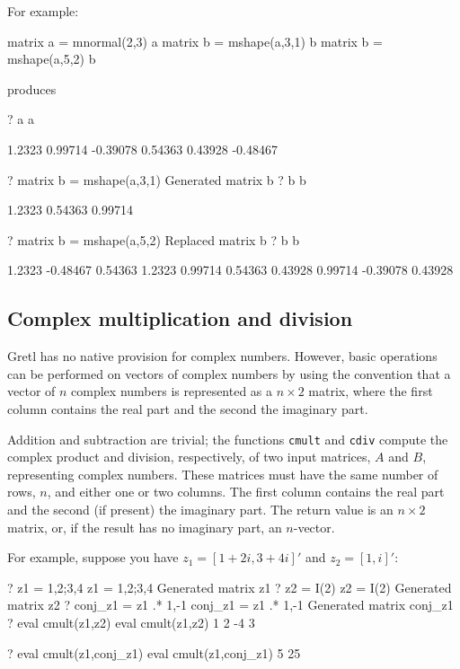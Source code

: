 For example:
\begin{code}
matrix a = mnormal(2,3)
a
matrix b = mshape(a,3,1)
b
matrix b = mshape(a,5,2)
b
\end{code}
produces
\begin{code}
?   a
a

      1.2323      0.99714     -0.39078
     0.54363      0.43928     -0.48467

?   matrix b = mshape(a,3,1)
Generated matrix b
?   b
b

      1.2323
     0.54363
     0.99714

?   matrix b = mshape(a,5,2)
Replaced matrix b
?   b
b

      1.2323     -0.48467
     0.54363       1.2323
     0.99714      0.54363
     0.43928      0.99714
    -0.39078      0.43928
\end{code}

\subsection{Complex multiplication and division}
\label{sec:complex}

Gretl has no native provision for complex numbers. However, basic
operations can be performed on vectors of complex numbers by using the
convention that a vector of $n$ complex numbers is represented as a $n
\times 2$ matrix, where the first column contains the real part and
the second the imaginary part.

Addition and subtraction are trivial; the functions \texttt{cmult}
and \texttt{cdiv} compute the complex product and division,
respectively, of two input matrices, $A$ and $B$, representing complex
numbers.  These matrices must have the same number of rows, $n$, and
either one or two columns.  The first column contains the real part
and the second (if present) the imaginary part.  The return value is
an $n \times 2$ matrix, or, if the result has no imaginary part, an
$n$-vector.

For example, suppose you have $z_1 = [ 1 + 2i , 3 + 4i ]'$ and $z_2 =
[ 1, i ]'$:

\begin{code}
? z1 = {1,2;3,4}
 z1 = {1,2;3,4}
Generated matrix z1
? z2 = I(2)
 z2 = I(2)
Generated matrix z2
? conj_z1 = z1 .* {1,-1}
 conj_z1 = z1 .* {1,-1}
Generated matrix conj_z1
? eval cmult(z1,z2)
 eval cmult(z1,z2)
   1    2 
  -4    3 

? eval cmult(z1,conj_z1)
 eval cmult(z1,conj_z1)
   5 
  25 
\end{code}

